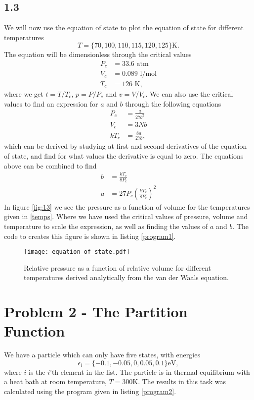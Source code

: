 \documentclass[a4paper,10pt, english]{article}
\begin{document}
\subsection*{1.3}
We will now use the equation of state to plot the equation of state for different temperatures
\begin{equation}
    T = \{70, 100, 110, 115, 120, 125\}\text{K}. \label{temps}
\end{equation}
The equation will be dimensionless through the critical values
\begin{align*}
    P_c &= 33.6 \text{ atm} \\
    V_c &= 0.089 \text{ l/mol} \\
    T_c &= 126 \text{ K},
\end{align*}
where we get $t=T/T_c$, $p=P/P_c$ and $v=V/V_c$.
We can also use the critical values to find an expression for $a$ and $b$ through the following equations
\begin{align*}
    P_c &= \frac{a}{27b^2}  \\
    V_c &= 3Nb \\
    kT_c &= \frac{8a}{27b},
\end{align*}
which can be derived by studying at first and second derivatives of the equation of state, and find for what values the derivative is equal to zero. The equations above can be combined to find
\begin{align*}
    b &= \frac{kT_c}{8P_c} \\
    a &= 27P_c\left(\frac{kT_c}{8P_c}\right)^2
\end{align*}
In figure \vref{fig:13} we see the pressure as a function of volume for the temperatures given in \eqref{temps}. Where we have used the critical values of pressure, volume and temperature to scale the expression, as well as finding the values of $a$ and $b$. The code to creates this figure is shown in listing \vref{program1}.

\begin{figure}[h!]
  \centering
    \texttt{[image: equation\_of\_state.pdf]}
    \caption{Relative pressure as a function of relative volume for different temperatures derived analytically from the van der Waals equation.}
    \label{fig:13}
\end{figure}

\section*{Problem 2 - The Partition Function}
We have a particle which can only have five states, with energies
\begin{equation}
    \epsilon_i = \{-0.1, -0.05, 0, 0.05, 0.1\} \text{eV}, \label{energy_1}
\end{equation}
where $i$ is the $i$'th element in the list. The particle is in thermal equilibrium with a heat bath at room temperature, $T=300$K.
The results in this task was calculated using the program given in listing \vref{program2}.
\end{document}
